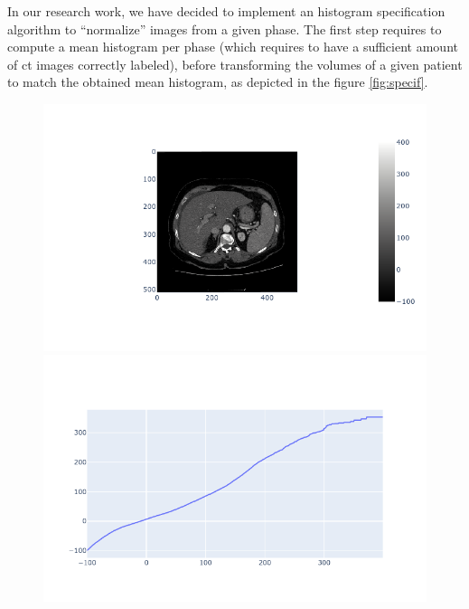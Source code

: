 In our research work, we have decided to implement an histogram
specification algorithm to ``normalize'' images from a given phase. The
first step requires to compute a mean histogram per phase (which requires to
have a sufficient amount of \ac{ct} images correctly labeled), before
transforming the volumes of a given patient to match the obtained mean
histogram, as depicted in the figure \ref{fig:specif}.

\begin{figure}[ht!]
\centering
\begin{minipage}{0.5\linewidth}
\includegraphics[width=\linewidth]{../Perspectives/images/image3.png}
\end{minipage}
\begin{minipage}{0.5\linewidth}
\includegraphics[width=\linewidth]{../Perspectives/images/image1.png}
\end{minipage}
\begin{minipage}{0.5\linewidth}

\end{minipage}
\end{figure}
